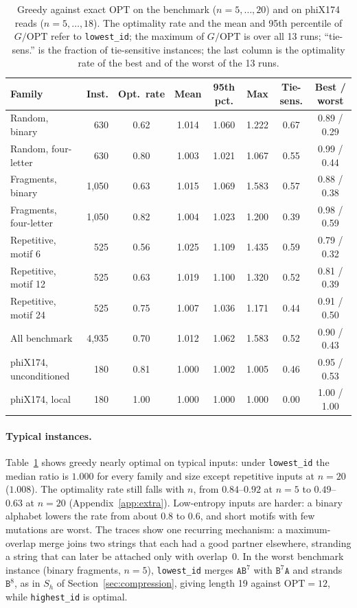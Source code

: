 \documentclass[11pt,a4paper]{article}   %
\theoremstyle{compact}
\theoremstyle{compactdef}
\newcommand{\OPT}{\mathrm{OPT}}
\newcommand{\GR}{G}                         %
\newcommand{\str}[1]{\texttt{#1}}           %
\begin{document}
\begin{table}[h]\centering\small
\caption{Greedy against exact $\OPT$ on the benchmark ($n=5,\dots,20$) and
on phiX174 reads ($n=5,\dots,18$). The optimality rate and the mean and
95th percentile of $\GR/\OPT$ refer to \texttt{lowest\_id}; the maximum of
$\GR/\OPT$ is over all 13 runs; ``tie-sens.'' is the fraction of
tie-sensitive instances; the last column is the optimality rate of the best
and of the worst of the 13 runs.}\label{tab:synthetic}
\begin{tabular}{lrcccccc}
\toprule
Family & Inst. & Opt.\ rate & Mean & 95th pct. & Max & Tie-sens. & Best / worst\\
\midrule
Random, binary         & 630     & 0.62 & 1.014 & 1.060 & 1.222 & 0.67 & 0.89 / 0.29\\
Random, four-letter    & 630     & 0.80 & 1.003 & 1.021 & 1.067 & 0.55 & 0.99 / 0.44\\
Fragments, binary      & 1{,}050 & 0.63 & 1.015 & 1.069 & 1.583 & 0.57 & 0.88 / 0.38\\
Fragments, four-letter & 1{,}050 & 0.82 & 1.004 & 1.023 & 1.200 & 0.39 & 0.98 / 0.59\\
Repetitive, motif 6    & 525     & 0.56 & 1.025 & 1.109 & 1.435 & 0.59 & 0.79 / 0.32\\
Repetitive, motif 12   & 525     & 0.63 & 1.019 & 1.100 & 1.320 & 0.52 & 0.81 / 0.39\\
Repetitive, motif 24   & 525     & 0.75 & 1.007 & 1.036 & 1.171 & 0.44 & 0.91 / 0.50\\
\midrule
All benchmark          & 4{,}935 & 0.70 & 1.012 & 1.062 & 1.583 & 0.52 & 0.90 / 0.43\\
\midrule
phiX174, unconditioned & 180     & 0.81 & 1.000 & 1.002 & 1.005 & 0.46 & 0.95 / 0.53\\
phiX174, local         & 180     & 1.00 & 1.000 & 1.000 & 1.000 & 0.00 & 1.00 / 1.00\\
\bottomrule
\end{tabular}
\end{table}

\paragraph{Typical instances.} Table~\ref{tab:synthetic} shows greedy nearly
optimal on typical inputs: under \texttt{lowest\_id} the median ratio is
$1.000$ for every family and size except repetitive inputs at $n=20$
($1.008$). The optimality rate still
falls with $n$, from $0.84$--$0.92$ at $n=5$ to $0.49$--$0.63$ at $n=20$
(Appendix~\ref{app:extra}). Low-entropy inputs are harder: a binary alphabet
lowers the rate from about $0.8$ to $0.6$, and short motifs with few
mutations are worst. The traces show one recurring mechanism: a
maximum-overlap merge joins two strings that each had a good partner elsewhere, stranding a
string that can later be attached only with overlap~$0$. In the worst
benchmark instance (binary fragments, $n=5$), \texttt{lowest\_id} merges
$\str{AB}^7$ with $\str{B}^7\str{A}$ and strands $\str{B}^8$, as in $S_h$ of
Section~\ref{sec:compression}, giving length 19 against $\OPT=12$, while
\texttt{highest\_id} is optimal.
\end{document}
